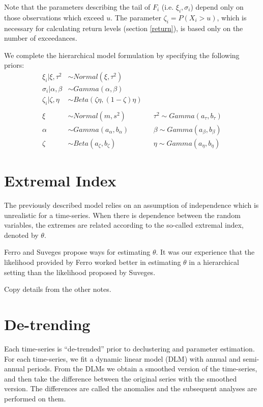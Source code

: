 \documentclass[12pt]{article}
\begin{document}
Note that the parameters describing the tail of $F_i$ (i.e. $\xi_i,\sigma_i$) depend only on those observations which exceed $u$. The parameter $\zeta_i=P(X_i>u)$, which is necessary for calculating return levels (section \ref{return}), is based only on the number of exceedances.

We complete the hierarchical model formulation by specifying the following priors:
\begin{align}
\xi_i|\xi, \tau^2  &\sim Normal(\xi, \tau^2) \nonumber \\
\sigma_i|\alpha, \beta &\sim Gamma(\alpha, \beta) \nonumber \\
\zeta_i|\zeta, \eta &\sim Beta(\zeta\eta, (1-\zeta)\eta) \nonumber \\
 \label{priors} \\
\xi &\sim Normal(m, s^2)&  &\tau^2 \sim Gamma(a_\tau, b_\tau) \nonumber \\
\alpha &\sim Gamma(a_\alpha, b_\alpha)&  &\beta \sim Gamma(a_\beta, b_\beta) \nonumber \\
\zeta &\sim Beta(a_\zeta, b_\zeta)&  &\eta \sim Gamma(a_\eta, b_\eta) \nonumber
\end{align}

\section{Extremal Index}
\label{index}

The previously described model relies on an assumption of independence which is unrealistic for a time-series. When there is dependence between the random variables, the extremes are related according to the so-called extremal index, denoted by $\theta$.

Ferro and Suveges propose ways for estimating $\theta$. It was our experience that the likelihood provided by Ferro worked better in estimating $\theta$ in a hierarchical setting than the likelihood proposed by Suveges. 

Copy details from the other notes.

\section{De-trending}
\label{anomaly}

Each time-series is ``de-trended'' prior to declustering and parameter estimation. For each time-series, we fit a dynamic linear model (DLM) with annual and semi-annual periods. From the DLMs we obtain a smoothed version of the time-series, and then take the difference between the original series with the smoothed version. The differences are called the anomalies and the subsequent analyses are performed on them.
\end{document}
